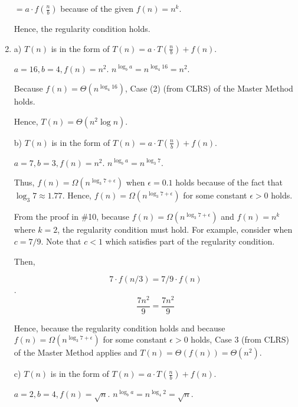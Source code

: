 \documentclass[a4paper]{report}
\begin{document}
\begin{enumerate}
        $             = a \cdot f(\frac{n}{b})$
        because of the given $f(n) = n^k$.

        Hence, the regularity condition holds. 

    \pagebreak
    \par
    \bigskip

    \item

      a) 
      $T(n)$ is in the form of $T(n) = a \cdot T(\frac{n}{b}) + f(n)$.

      $a = 16, b = 4, f(n) = n^2$. $n^{\log_b a} = n^{\log_4 16} = n^2$. 

      Because $f(n) = \Theta(n^{\log_4 16})$, Case (2) (from CLRS) of the Master Method holds. 

      Hence, $T(n) = \Theta(n^2 \log n)$. 


      \bigskip

      b) 
      $T(n)$ is in the form of $T(n) = a \cdot T(\frac{n}{b}) + f(n)$.

      $a = 7, b = 3, f(n) = n^2$. $n^{\log_b a} = n^{\log_3 7}$. 

      Thus, $f(n) = \Omega(n^{\log_3 7 + \epsilon})$ when $\epsilon=0.1$ holds because of the fact that
      $\log_3 7 \approx 1.77$. Hence, $f(n) = \Omega(n^{\log_3 7 + \epsilon})$ for some constant $\epsilon>0$ holds.

      From the proof in \#10, because $f(n) = \Omega(n^{\log_3 7 + \epsilon})$ and $f(n) = n^k$ where $k=2$,
      the regularity condition must hold. For example, consider when $c = 7/9$. Note that $c < 1$ which satisfies part of the
      regularity condition. 
      
      Then,
      
      $$7 \cdot f(n/3) = 7/9 \cdot f(n)$$.
      $$\frac{7 n^2}{9}= \frac{7 n^2}{9}$$ 

      Hence, because the regularity condition holds and because $f(n) = \Omega(n^{\log_3 7 + \epsilon})$ for some constant $\epsilon>0$ holds,
      Case 3 (from CLRS) of the Master Method applies and $T(n) = \Theta(f(n)) = \Theta(n^2)$.


      \bigskip
      c) 
      $T(n)$ is in the form of $T(n) = a \cdot T(\frac{n}{b}) + f(n)$.
      
      $a = 2, b = 4, f(n) = \sqrt{n}$. $n^{\log_b a} = n^{\log_4 2} = \sqrt{n}$. 


\end{enumerate}
\end{document}
